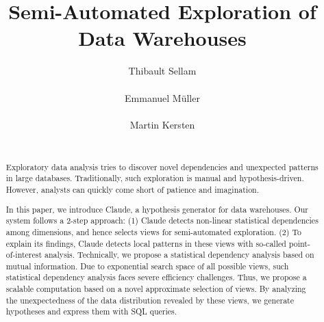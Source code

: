 \documentclass{sig-alternate}
\begin{document}
\title{Semi-Automated Exploration of Data Warehouses}


\author{
\alignauthor
Thibault Sellam\\
       \\
\alignauthor
Emmanuel M\"uller\\
       \\
\alignauthor
Martin Kersten\\
       \\
}

\maketitle

\begin{abstract}
Exploratory data analysis tries to discover novel dependencies and unexpected patterns in large databases. Traditionally, such exploration is manual and hypothesis-driven. However, analysts can quickly come short of patience and imagination.

In this paper, we introduce Claude, a hypothesis generator for data warehouses. Our system follows a 2-step approach: (1) Claude detects non-linear statistical dependencies among dimensions, and hence selects views for semi-automated exploration. (2) To explain its findings, Claude detects local patterns in these views with so-called point-of-interest analysis. Technically, we propose a statistical dependency analysis based on mutual information. Due to exponential search space of all possible views, such statistical dependency analysis faces severe efficiency challenges. Thus, we propose a scalable computation based on a novel approximate selection of views. By analyzing the unexpectedness of the data distribution revealed by these views, we generate hypotheses and express them with SQL queries.
\end{abstract}





\balancecolumns
\end{document}
